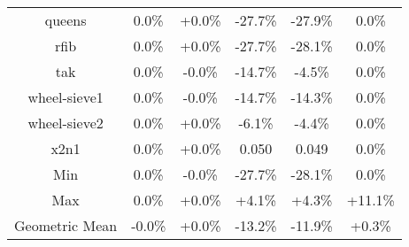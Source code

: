 \begin{tabular}{ c c c c c c }
queens &  0.0\% & +0.0\% & -27.7\% & -27.9\% &  0.0\%\\
rfib &  0.0\% & +0.0\% & -27.7\% & -28.1\% &  0.0\%\\
tak &  0.0\% & -0.0\% & -14.7\% & -4.5\% &  0.0\%\\
wheel-sieve1 &  0.0\% & -0.0\% & -14.7\% & -14.3\% &  0.0\%\\
wheel-sieve2 &  0.0\% & +0.0\% & -6.1\% & -4.4\% &  0.0\%\\
x2n1 &  0.0\% & +0.0\% & 0.050 & 0.049 &  0.0\%\\
\hline
Min &  0.0\% & -0.0\% & -27.7\% & -28.1\% &  0.0\%\\
Max &  0.0\% & +0.0\% & +4.1\% & +4.3\% & +11.1\%\\
Geometric Mean & -0.0\% & +0.0\% & -13.2\% & -11.9\% & +0.3\%\\


\end{tabular}
